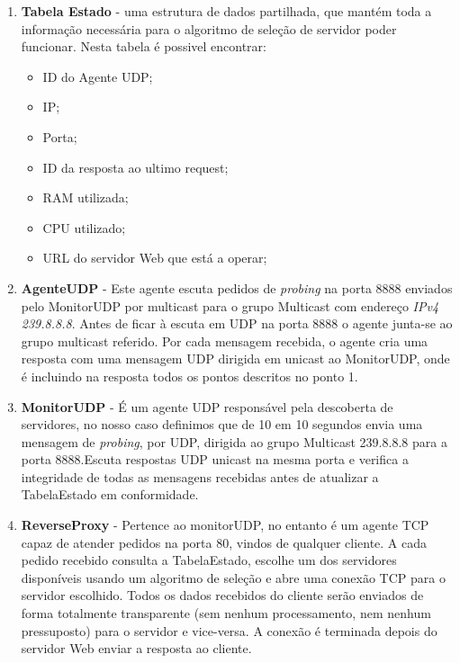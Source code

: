 \documentclass{llncs}
\begin{document}
		\begin{enumerate}

			\item \textbf{Tabela Estado} - uma estrutura de dados partilhada, que mantém toda a informação necessária para o algoritmo de seleção de servidor poder funcionar. Nesta tabela é possivel encontrar: 
			\begin{itemize}
				\item{ID do Agente UDP;}
				\item{IP;}
				\item{Porta;}
				\item{ID da resposta ao ultimo request;}
				\item{RAM utilizada;}
				\item{CPU utilizado;}
				\item{URL do servidor Web que está a operar;}
			\end{itemize}
			\bigskip
			\item \textbf{AgenteUDP} - Este agente escuta pedidos de \textit{probing} na porta 8888 enviados pelo MonitorUDP por multicast para o grupo Multicast com endereço \textit{IPv4 239.8.8.8}. Antes de ficar à escuta em UDP na porta 8888 o agente junta-se ao grupo multicast referido. Por cada mensagem recebida, o agente cria uma resposta com uma mensagem UDP dirigida em unicast ao MonitorUDP, onde é incluindo na resposta todos os pontos descritos no ponto 1.

			\bigskip
			\item \textbf{MonitorUDP} - É um agente UDP responsável pela descoberta de servidores, no nosso caso definimos que de 10 em 10 segundos envia uma mensagem de \textit{probing}, por UDP, dirigida ao grupo Multicast 239.8.8.8 para a porta 8888.Escuta respostas UDP unicast na mesma porta e verifica a integridade de todas as mensagens recebidas antes de atualizar a TabelaEstado em conformidade.

			\bigskip
			\item \textbf{ReverseProxy} - Pertence ao monitorUDP, no entanto é um agente TCP capaz de atender pedidos na porta 80, vindos de qualquer cliente. A cada pedido recebido consulta a TabelaEstado, escolhe um dos servidores disponíveis usando um algoritmo de seleção e abre uma conexão TCP para o servidor escolhido. Todos os dados recebidos do cliente serão enviados de forma totalmente transparente (sem nenhum processamento, nem nenhum pressuposto) para o servidor e vice-versa. A conexão é terminada depois do servidor Web enviar a resposta ao cliente.

		\end{enumerate}
\end{document}
